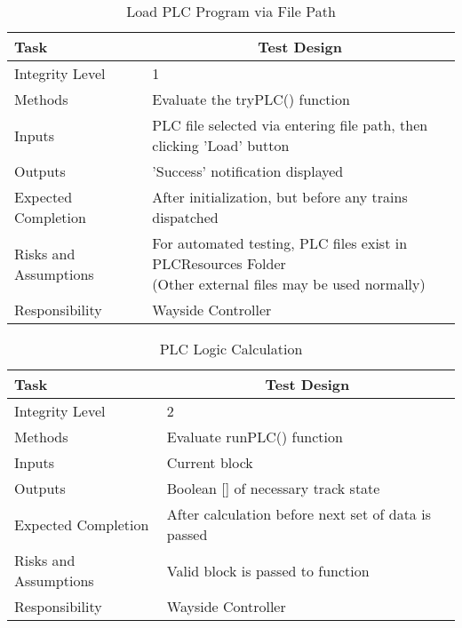 \documentclass[]{article}
\begin{document}
\begin{table}[H]
	\centering
	\caption{Load PLC Program via File Path}
	\begin{tabular}{|l|l|}
		\hline
		Task & \multicolumn{1}{c|}{Test Design} \\ \hline
		Integrity Level & 1 \\ \hline
		Methods & Evaluate the tryPLC() function\\ \hline
		Inputs &  PLC file selected via entering file path, then clicking 'Load' button \\ \hline
		Outputs &  'Success' notification displayed \\ \hline
		Expected Completion & After initialization, but before any trains dispatched\\ \hline
		Risks and Assumptions & \parbox[t]{10cm}{For automated testing, PLC files exist in PLCResources Folder \\(Other external files may be used normally)} \\ \hline
		Responsibility & Wayside Controller\\ \hline
	\end{tabular}
\end{table}

\begin{table}[H]
	\centering
	\caption{PLC Logic Calculation}
	\begin{tabular}{|l|l|}
		\hline
		Task & \multicolumn{1}{c|}{Test Design} \\ \hline
		Integrity Level & 2 \\ \hline
		Methods & Evaluate runPLC() function\\ \hline
		Inputs &  Current block \\ \hline
		Outputs &  Boolean [] of necessary track state \\ \hline
		Expected Completion & After calculation before next set of data is passed\\ \hline
		Risks and Assumptions & \parbox[t]{10cm}{Valid block is passed to function} \\ \hline
		Responsibility & Wayside Controller\\ \hline
	\end{tabular}
\end{table}
\end{document}
